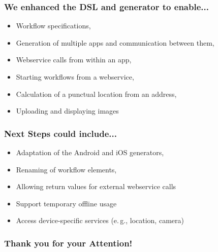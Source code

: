 \begin{frame}[t]
    \frametitle{We enhanced the DSL and generator to enable...}
    
    \begin{itemize}
    	\item Workflow specifications,
    	\item Generation of multiple apps and communication between them,
    	\item Webservice calls from within an app,
    	\item Starting workflows from a webservice,
    	\item Calculation of a punctual location from an address,
    	\item Uploading and displaying images
    \end{itemize}

\end{frame}

\begin{frame}[t]
    \frametitle{Next Steps could include...}

	\begin{itemize}
		\item Adaptation of the Android and iOS generators,
		\item Renaming of workflow elements,
		\item Allowing return values for external webservice calls
		\item Support temporary offline usage
		\item Access device-specific services (e.\,g., location, camera)
	\end{itemize}
\end{frame}

\begin{frame}
\frametitle{Thank you for your Attention!}
	\begin{center}
	\end{center}
\end{frame}
